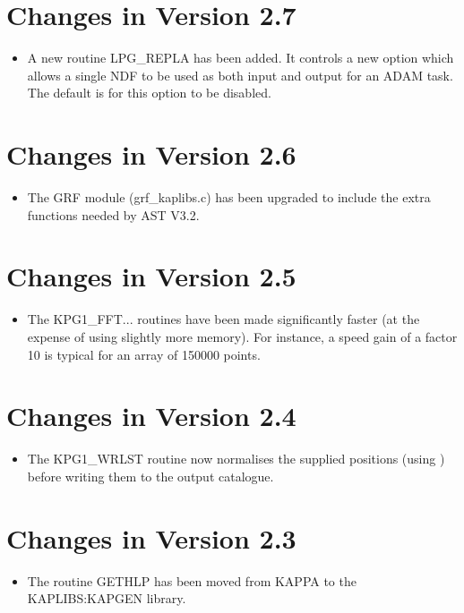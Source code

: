 \section{Changes in Version 2.7}
\begin{itemize}
\item A new routine LPG\_REPLA has been added. It controls a new option
      which allows a single NDF to be used as both input and output for an
      ADAM task.  The default is for this option to be disabled.
\end{itemize}

\section{Changes in Version 2.6}
\begin{itemize}
\item The GRF module (grf\_kaplibs.c) has been upgraded to include the
      extra functions needed by AST V3.2.
\end{itemize}

\section{Changes in Version 2.5}
\begin{itemize}
\item The KPG1\_FFT... routines have been made significantly faster (at
      the expense of using slightly more memory). For instance, a speed gain
      of a factor 10 is typical for an array of 150000 points.
\end{itemize}

\section{Changes in Version 2.4}
\begin{itemize}
\item The KPG1\_WRLST routine now normalises the supplied positions (using
      ) before writing them to the output
      catalogue.
\end{itemize}

\section{Changes in Version 2.3}
\begin{itemize}
\item The routine GETHLP has been moved from KAPPA to the KAPLIBS:KAPGEN library.
\end{itemize}

